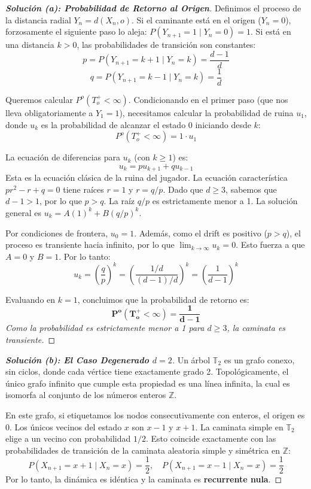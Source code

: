 \documentclass[10pt,a4paper]{article}
\begin{document}
\begin{proof}[\textbf{Solución (a): Probabilidad de Retorno al Origen}]
    Definimos el proceso de la distancia radial $Y_n = d(X_n, o)$. 
    Si el caminante está en el origen ($Y_n = 0$), forzosamente el siguiente paso lo aleja: $P(Y_{n+1} = 1 \mid Y_n = 0) = 1$.
    Si está en una distancia $k > 0$, las probabilidades de transición son constantes:
    \[ p = P(Y_{n+1} = k+1 \mid Y_n = k) = \frac{d-1}{d} \]
    \[ q = P(Y_{n+1} = k-1 \mid Y_n = k) = \frac{1}{d} \]
    
    Queremos calcular $P^o(T_o^+ < \infty)$. Condicionando en el primer paso (que nos lleva obligatoriamente a $Y_1 = 1$), necesitamos calcular la probabilidad de ruina $u_1$, donde $u_k$ es la probabilidad de alcanzar el estado $0$ iniciando desde $k$:
    \[ P^o(T_o^+ < \infty) = 1 \cdot u_1 \]
    
    La ecuación de diferencias para $u_k$ (con $k \ge 1$) es:
    \[ u_k = p u_{k+1} + q u_{k-1} \]
    Esta es la ecuación clásica de la ruina del jugador. La ecuación característica $pr^2 - r + q = 0$ tiene raíces $r=1$ y $r=q/p$.
    Dado que $d \ge 3$, sabemos que $d-1 > 1$, por lo que $p > q$. La raíz $q/p$ es estrictamente menor a 1.
    La solución general es $u_k = A(1)^k + B(q/p)^k$.
    
    Por condiciones de frontera, $u_0 = 1$. Además, como el drift es positivo ($p > q$), el proceso es transiente hacia infinito, por lo que $\lim_{k \to \infty} u_k = 0$. 
    Esto fuerza a que $A = 0$ y $B = 1$. Por lo tanto:
    \[ u_k = \left(\frac{q}{p}\right)^k = \left( \frac{1/d}{(d-1)/d} \right)^k = \left( \frac{1}{d-1} \right)^k \]
    
    Evaluando en $k=1$, concluimos que la probabilidad de retorno es:
    \[ \mathbf{P^o(T_o^+ < \infty) = \frac{1}{d-1}} \]
    \textit{Como la probabilidad es estrictamente menor a 1 para $d \ge 3$, la caminata es transiente.}
\end{proof}

\vspace{5mm}

\begin{proof}[\textbf{Solución (b): El Caso Degenerado $d=2$}]
    Un árbol $\mathbb{T}_2$ es un grafo conexo, sin ciclos, donde cada vértice tiene exactamente grado 2. Topológicamente, el único grafo infinito que cumple esta propiedad es una línea infinita, la cual es isomorfa al conjunto de los números enteros $\mathbb{Z}$.
    
    En este grafo, si etiquetamos los nodos consecutivamente con enteros, el origen es $0$. Los únicos vecinos del estado $x$ son $x-1$ y $x+1$. 
    La caminata simple en $\mathbb{T}_2$ elige a un vecino con probabilidad $1/2$. Esto coincide exactamente con las probabilidades de transición de la caminata aleatoria simple y simétrica en $\mathbb{Z}$:
    \[ P(X_{n+1} = x+1 \mid X_n = x) = \frac{1}{2}, \quad P(X_{n+1} = x-1 \mid X_n = x) = \frac{1}{2} \]
    Por lo tanto, la dinámica es idéntica y la caminata es \textbf{recurrente nula}.
\end{proof}
\end{document}
